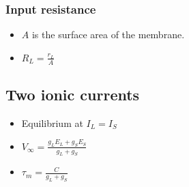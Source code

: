 \documentclass[a4paper, 12pt]{article}
\begin{document}
\subsubsection{Input resistance}
\begin{itemize}[noitemsep,nolistsep]
	\item $A$ is the surface area of the membrane.
	\item $R_L = \frac{r_L}{A}$
\end{itemize}

\subsection{Two ionic currents}
\begin{itemize}[noitemsep,nolistsep]
	\item Equilibrium at $I_L=I_S$
	\item $V_\infty = \frac{g_LE_L+g_SE_S}{g_L+g_S}$
	\item $\tau_m = \frac{C}{g_L+g_S}$
\end{itemize}
\end{document}
